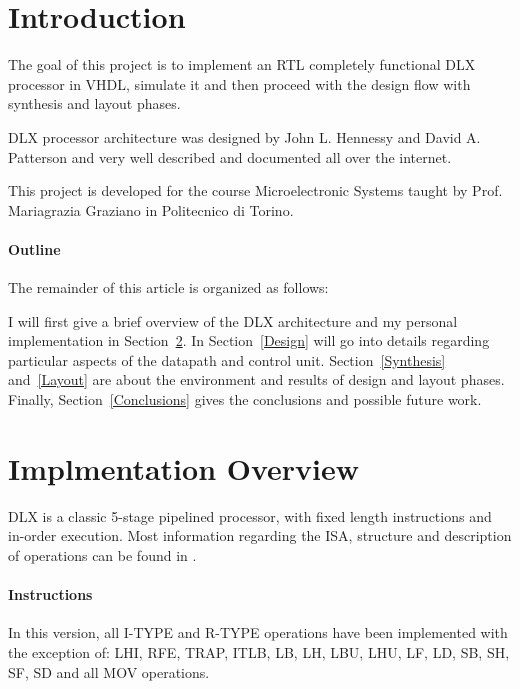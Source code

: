 \documentclass[12pt]{article}
\begin{document}
\maketitle
\tableofcontents

\section{Introduction}
The goal of this project is to implement an RTL completely functional DLX processor in VHDL, simulate it and then proceed with the design flow with synthesis and layout phases.

DLX processor architecture was designed by John L. Hennessy and David A. Patterson\cite{Patterson:1990:CAQ:77493} and very well described and documented all over the internet.

This project is developed for the course Microelectronic Systems taught by Prof. Mariagrazia Graziano in Politecnico di Torino\cite{MGLECTURENOTES}.



\paragraph{Outline}
The remainder of this article is organized as follows:
 
I will first give a brief overview of the DLX architecture and my personal implementation in Section~\ref{Overview}.
In Section~\ref{Design} will go into details regarding particular aspects of the datapath and control unit.
Section~\ref{Synthesis} and~\ref{Layout} are about the environment and results of design and layout phases.
Finally, Section~\ref{Conclusions} gives the conclusions and possible future work.

\section{Implmentation Overview}\label{Overview}
DLX is a classic 5-stage pipelined processor, with fixed length instructions and in-order execution.
Most information regarding the ISA, structure and description of operations can be found in \cite{ISA}.
\paragraph{Instructions}
In this version, all I-TYPE and R-TYPE operations have been implemented with the exception of: LHI, RFE, TRAP, ITLB, LB, LH, LBU, LHU, LF, LD, SB, SH, SF, SD and all MOV operations.
\end{document}
